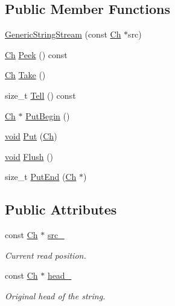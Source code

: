 \subsection*{Public Member Functions}
\begin{DoxyCompactItemize}
\item 
\hyperlink{structGenericStringStream_a6b20885ed64e33f5d081a1e83b07da06}{Generic\+String\+Stream} (const \hyperlink{structGenericStringStream_a4289aca895330084ff3168e37e4f08bd}{Ch} $\ast$src)
\item 
\hyperlink{structGenericStringStream_a4289aca895330084ff3168e37e4f08bd}{Ch} \hyperlink{structGenericStringStream_a0c8fea9c2740c2953af9b3bb28bd469b}{Peek} () const
\item 
\hyperlink{structGenericStringStream_a4289aca895330084ff3168e37e4f08bd}{Ch} \hyperlink{structGenericStringStream_a0d26e3e77e4fca64a87c2d71f48ac5e5}{Take} ()
\item 
size\+\_\+t \hyperlink{structGenericStringStream_abc73d04baf4c7c58f383bc52536e8ac4}{Tell} () const
\item 
\hyperlink{structGenericStringStream_a4289aca895330084ff3168e37e4f08bd}{Ch} $\ast$ \hyperlink{structGenericStringStream_a88c908b4dac9773240ce4bca4b6dd837}{Put\+Begin} ()
\item 
\hyperlink{imgui__impl__opengl3__loader_8h_ac668e7cffd9e2e9cfee428b9b2f34fa7}{void} \hyperlink{structGenericStringStream_aaa59dc5313151a4125bf7840f87a33eb}{Put} (\hyperlink{structGenericStringStream_a4289aca895330084ff3168e37e4f08bd}{Ch})
\item 
\hyperlink{imgui__impl__opengl3__loader_8h_ac668e7cffd9e2e9cfee428b9b2f34fa7}{void} \hyperlink{structGenericStringStream_a5ff1a870d9334cd054cf4ca34c86ddc3}{Flush} ()
\item 
size\+\_\+t \hyperlink{structGenericStringStream_a07b942bacda494afb3b2f7629cef14af}{Put\+End} (\hyperlink{structGenericStringStream_a4289aca895330084ff3168e37e4f08bd}{Ch} $\ast$)
\end{DoxyCompactItemize}
\subsection*{Public Attributes}
\begin{DoxyCompactItemize}
\item 
const \hyperlink{structGenericStringStream_a4289aca895330084ff3168e37e4f08bd}{Ch} $\ast$ \hyperlink{structGenericStringStream_aeda813798e3f2d6bfdac86afc11b6b80}{src\+\_\+}
\begin{DoxyCompactList}\small\item\em Current read position. \end{DoxyCompactList}\item 
const \hyperlink{structGenericStringStream_a4289aca895330084ff3168e37e4f08bd}{Ch} $\ast$ \hyperlink{structGenericStringStream_a3c86ef1e1f0655028cb8a3afce11ee4f}{head\+\_\+}
\begin{DoxyCompactList}\small\item\em Original head of the string. \end{DoxyCompactList}\end{DoxyCompactItemize}


